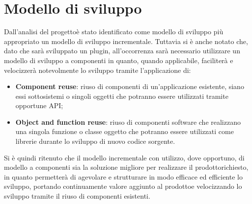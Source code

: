 \section{Modello di sviluppo}
Dall'analisi del progetto\glosp è stato identificato come modello di sviluppo più appropriato un modello di sviluppo incrementale. Tuttavia si è anche notato che, dato che sarà sviluppato un plugin, all'occorrenza sarà necessario utilizzare un modello di sviluppo a componenti in quanto, quando applicabile, faciliterà e velocizzerà notevolmente lo sviluppo tramite l'applicazione di:
\begin{itemize}
	\item \textbf{Component reuse}: riuso di componenti di un'applicazione esistente, siano essi sottosistemi o singoli oggetti che potranno essere utilizzati tramite opportune API;
	\item \textbf{Object and function reuse}: riuso di componenti software che realizzano una singola funzione o classe oggetto che potranno essere utilizzati come librerie durante lo sviluppo di nuovo codice sorgente.
\end{itemize}
Si è quindi ritenuto che il modello incrementale con utilizzo, dove opportuno, di modello a componenti sia la soluzione migliore per realizzare il prodotto\glosp richiesto, in quanto permetterà di agevolare e strutturare in modo efficace ed efficiente lo sviluppo, portando continuamente valore aggiunto al prodotto\glosp e velocizzando lo sviluppo tramite il riuso di componenti esistenti.

